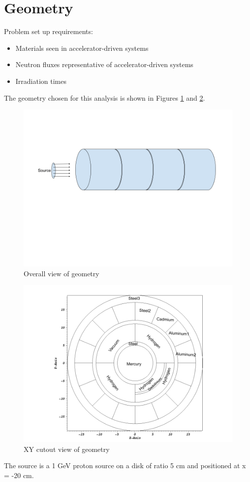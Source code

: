 \section{Geometry}
Problem set up requirements: 
\begin{itemize}
	\item{Materials seen in accelerator-driven systems}
	\item{Neutron fluxes representative of accelerator-driven systems}
	\item{Irradiation times}
\end{itemize}
%
The geometry chosen for this analysis is shown in Figures 
\ref{fig:snilb3D} and \ref{fig:snilbxy}. 
%
\begin{figure}[h]
	\centering
	\includegraphics[scale=0.5]{figs/snilb3D_view.png}
	\caption{Overall view of geometry}
	\label{fig:snilb3D}
\end{figure}
\begin{figure}[!h]
	\centering
	\includegraphics[scale=0.5]{figs/snilb_xy_labeled.png}
	\caption{XY cutout view of geometry}
	\label{fig:snilbxy}
\end{figure}
%
The source is a 1 GeV proton source on a disk of ratio 5 cm and 
positioned at x = -20 cm. 

